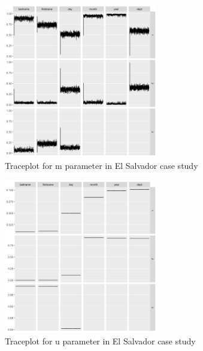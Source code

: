 \documentclass[ba]{imsart}
\begin{document}
\begin{figure}[!h]
\begin{center}
\includegraphics[width=0.6\textwidth]{../notes/figures/el_salvador/m_trace} 
\caption{Traceplot for m parameter in El Salvador case study}\label{fig:m_trace}
\end{center}
\end{figure}

\begin{figure}[!h]
\begin{center}
\includegraphics[width=0.6\textwidth]{../notes/figures/el_salvador/u_trace} 
\caption{Traceplot for u parameter in El Salvador case study}\label{fig:u_trace}
\end{center}
\end{figure}
\end{document}

